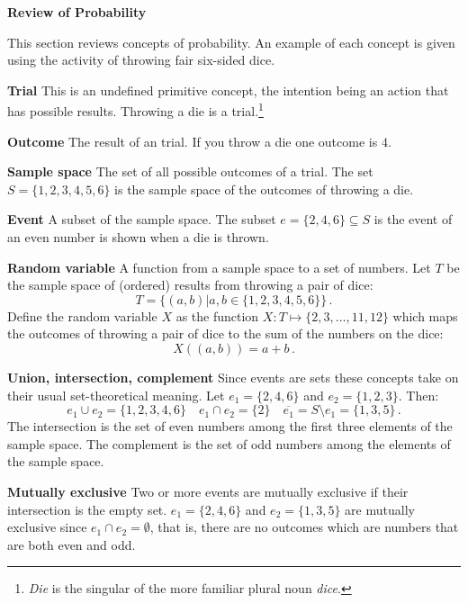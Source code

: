

\newpage

\begin{center}
\textbf{\LARGE Review of Probability}
\end{center}

This section reviews concepts of probability. An example of each concept is given using the activity of throwing fair six-sided dice.

\textbf{Trial} This is an undefined primitive concept, the intention being an action that has possible results. Throwing a die is a trial.\footnote{\emph{Die} is the singular of the more familiar plural noun \emph{dice}.}

\textbf{Outcome} The result of an trial. If you throw a die one outcome is $4$.

\textbf{Sample space} The set of all possible outcomes of a trial. The set $S=\{1,2,3,4,5,6\}$ is the sample space of the outcomes of throwing a die.

\textbf{Event} A subset of the sample space. The subset $e=\{2,4,6\}\subseteq S$ is the event of an even number is shown when a die is thrown.

\textbf{Random variable} A function from a sample space to a set of numbers. Let $T$ be the sample space of (ordered) results from throwing a pair of dice:
\[
T=\{(a,b)| a,b\in \{1,2,3,4,5,6\} \}\,.
\]
Define the random variable $X$ as the function $X:T \mapsto \{2,3,\ldots,11,12\}$ which maps the outcomes of throwing a pair of dice to the sum of the numbers on the dice:
\begin{equation}\label{eq.sum}
X((a,b)) = a+b\,.
\end{equation}

\textbf{Union, intersection, complement} Since events are sets these concepts take on their usual set-theoretical meaning. Let  $e_1=\{2,4,6\}$ and $e_2=\{1,2,3\}$. Then:
\[
e_1 \cup e_2=\{1,2,3,4,6\}\quad e_1 \cap e_2=\{2\}\quad \overline{e_1} = S\setminus e_1=\{1,3,5\}\,.
\]
The intersection is the set of even numbers among the first three elements of the sample space. The complement is the set of odd numbers among the elements of the sample space.

\textbf{Mutually exclusive} Two or more events are mutually exclusive if their intersection is the empty set. $e_1=\{2,4,6\}$ and $e_2=\{1,3,5\}$ are mutually exclusive since $e_1 \cap e_2=\emptyset$, that is, there are no outcomes which are numbers that are both even and odd.

